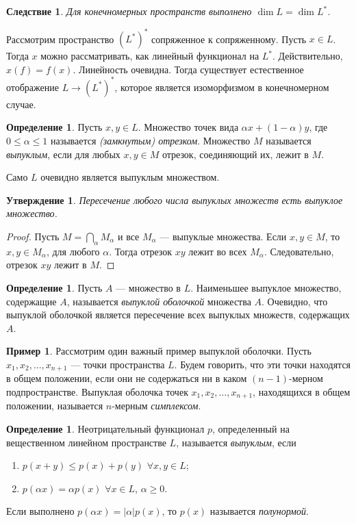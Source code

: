 \documentclass[12pt, titlepage, oneside]{amsbook}
\newtheorem{corollary}[theorem]{Следствие}
\newtheorem{claim}[theorem]{Утверждение}
\theoremstyle{definition}
\newtheorem{example}[theorem]{Пример}
\newtheorem{definition}[theorem]{Определение}
\theoremstyle{remark}
\begin{document}
\begin{corollary}
\label{LP3}
Для конечномерных пространств выполнено $\dim L=\dim L^*$.
\end{corollary}

Рассмотрим пространство $(L^*)^*$ сопряженное к сопряженному. Пусть $x\in L$. Тогда $x$ можно рассматривать, как линейный функционал на $L^*$. Действительно, $x(f)=f(x)$. Линейность очевидна. Тогда существует естественное отображение $L\rightarrow (L^*)^*$, которое является изоморфизмом в конечномерном случае.

\begin{definition}
Пусть $x,y\in L$. Множество точек вида $\alpha x+(1-\alpha)y$, где $0\leq \alpha\leq 1$ называется \emph{(замкнутым) отрезком}. Множество $M$ называется \emph{выпуклым}, если для любых $x,y\in M$ отрезок, соединяющий их, лежит в $M$.
\end{definition}

Само $L$ очевидно является выпуклым множеством.

 \begin{claim}
\label{Vyp1}
Пересечение любого числа выпуклых множеств есть выпуклое множество.
\end{claim}

\begin{proof}
Пусть $M=\bigcap\limits_{\alpha} M_{\alpha}$ и все $M_{\alpha}$ --- выпуклые множества. Если $x,y\in M$, то $x,y\in M_{\alpha}$, для любого $\alpha$. Тогда отрезок $xy$ лежит во всех $M_{\alpha}$. Следовательно, отрезок $xy$ лежит в $M$.
\end{proof}

\begin{definition}
Пусть $A$ --- множество в $L$. Наименьшее выпуклое множество, содержащие $A$, называется \emph{выпуклой оболочкой} множества $A$. Очевидно, что выпуклой оболочкой является пересечение всех выпуклых множеств, содержащих $A$.
\end{definition}

\begin{example}
Рассмотрим один важный пример выпуклой оболочки. Пусть $x_1,x_2,\ldots,x_{n+1}$ --- точки пространства $L$. Будем говорить, что эти точки находятся в общем положении, если они не содержаться ни в каком $(n-1)$-мерном подпространстве. Выпуклая оболочка точек $x_1,x_2,\ldots,x_{n+1}$, находящихся в общем положении, называется $n$-мерным \emph{симплексом}.
\end{example}

\begin{definition}
Неотрицательный функционал $p$, определенный на вещественном линейном пространстве $L$, называется \emph{выпуклым}, если
\begin{enumerate}
\item $p(x+y)\leq p(x)+p(y)$ $\forall x,y\in L$;
\item $p(\alpha x)=\alpha p(x)$ $\forall x\in L$, $\alpha\geq 0$.
\end{enumerate}
Если выполнено $p(\alpha x)=|\alpha| p(x)$, то $p(x)$ называется \emph{полунормой}.
\end{definition}
\end{document}
